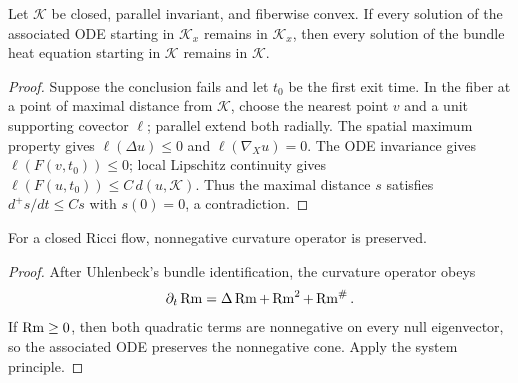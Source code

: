 \begin{theorem}
\label{thm:chow-ii-system-wmp}


Let $\mathcal K$ be closed, parallel invariant, and fiberwise convex.  If every
solution of the associated ODE starting in $\mathcal K_x$ remains in
$\mathcal K_x$, then every solution of the bundle heat equation starting in
$\mathcal K$ remains in $\mathcal K$.
\end{theorem}
\begin{proof}
\sketch
{}
Suppose the conclusion fails and let $t_0$ be the first exit time.  In the fiber
at a point of maximal distance from $\mathcal K$, choose the nearest point $v$
and a unit supporting covector $\ell$; parallel extend both radially.  The
spatial maximum property gives $\ell(\Delta u)\le0$ and
$\ell(\nabla_Xu)=0$.  The ODE invariance gives $\ell(F(v,t_0))\le0$; local
Lipschitz continuity gives $\ell(F(u,t_0))\le C\,d(u,\mathcal K)$.  Thus the
maximal distance $s$ satisfies $d^+s/dt\le Cs$ with $s(0)=0$, a contradiction.
\end{proof}

\begin{theorem}
\label{thm:chow-ii-curvature-operator-preservation}


For a closed Ricci flow, nonnegative curvature operator is preserved.
\end{theorem}
\begin{proof}
\sketch
{}
After Uhlenbeck's bundle identification, the curvature operator obeys
\[
\partial_t\operatorname{Rm}=\Delta\operatorname{Rm}+\operatorname{Rm}^2+\operatorname{Rm}^\#.
\]
If $\operatorname{Rm}\ge0$, then both quadratic terms are nonnegative on every null
eigenvector, so the associated ODE preserves the nonnegative cone.  Apply the
system principle.
\end{proof}

